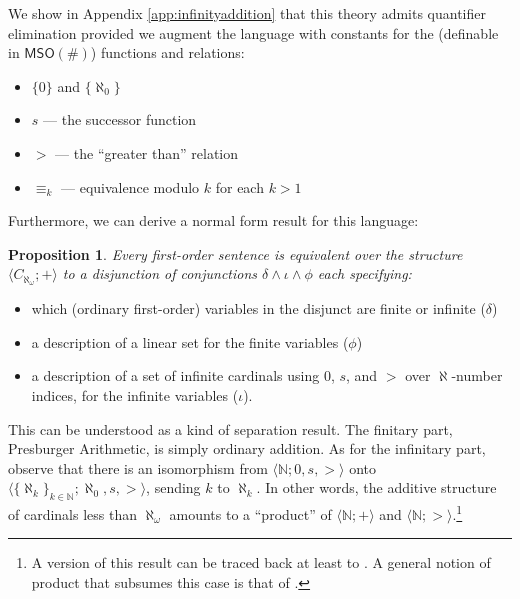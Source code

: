 \documentclass[12pt,oneside,reqno]{amsart}
\newtheorem{proposition}{Proposition}
\theoremstyle{definition}
\begin{document}
We show in Appendix \ref{app:infinityaddition} that this theory admits quantifier elimination provided we augment the language with constants for the (definable in $\mathsf{MSO}(\#)$) functions and relations:\vspace{1ex}
\begin{itemize}
    \item $\{0\}$ and $\{\aleph_0\}$\vspace{1mm}
    \item $s$ --- the successor function\vspace{1mm}
    \item $>$ --- the ``greater than'' relation \vspace{1mm}
    \item $\equiv_k$ --- equivalence modulo $k$ for each $k>1$
\end{itemize} 
Furthermore, we can derive a normal form result for this language:
\begin{proposition} \label{cardinal:normalform} Every first-order sentence is equivalent over the structure $\langle C_{\aleph_\omega};+ \rangle$ to a disjunction of conjunctions $\delta \wedge \iota \wedge \phi$ each specifying:\vspace{-0.3ex} \end{proposition} \begin{itemize}
    \item which (ordinary first-order) variables in the disjunct are finite or infinite ($\delta$)
    \item a description of a linear set for the finite variables ($\phi$)
    \item a description of a set of infinite cardinals using $0$, $s$, and $>$ over $\aleph$-number indices, for the infinite variables ($\iota$).\vspace{0.5ex}
\end{itemize}
This can be understood as a kind of separation result. The finitary part, Presburger Arithmetic, is simply ordinary addition. As for the infinitary part, observe that there is an isomorphism from $\langle \mathbb{N};0,s,>\rangle$ onto $\langle \{\aleph_k\}_{k\in\mathbb{N}}; \aleph_0,s,> \rangle$, sending $k$ to $\aleph_k$. In other words, the additive structure of cardinals less than $\aleph_\omega$ amounts to a  ``product'' of $\langle \mathbb{N};+ \rangle$ and $\langle \mathbb{N};> \rangle$.\footnote{A version of this result can be traced back at least to \cite{MostowskiTarski}. A general notion of product that subsumes this case is that of \cite{FefermanVaught}.}
\end{document}
